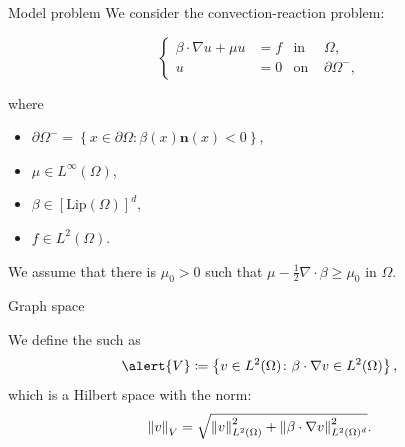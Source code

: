 \begin{frame}{Model problem}
	We consider the convection-reaction problem:
	\begin{block}{}
	\begin{equation*}
	\left\{
	\begin{aligned}
	\beta\cdot\nabla u+\mu u&=f & \text{in } &\Omega, \\
	u&=0 & \text{on } &\partial\Omega^-,
	\end{aligned}
	\right.
	\end{equation*}
	\end{block}
	where 
	\begin{itemize}
		\item $\partial\Omega^-=\left\{x\in\partial\Omega\colon \beta(x)\mathbf{n}(x)<0\right\},$
		\item $\mu\in L^\infty(\Omega)$,
		\item $\beta\in\left[\text{Lip}(\Omega)\right]^d$,
		\item $f\in L^2(\Omega)$.
	\end{itemize}
	\vspace*{.5cm}
	We assume that there is $\mu_0>0$ such that $\displaystyle\mu-\frac{1}{2}\nabla\cdot\beta\geq\mu_0$ in $\Omega$.
	
	\end{frame}
	
	\begin{frame}{Graph space}
	
	\begin{definicion}
	We define the  such as $$\alert{V}\coloneqq\left\{v\in L^2(\Omega)\colon\beta\cdot\nabla v\in L^2(\Omega) \right\},$$
	which is a Hilbert space with the norm:
	$$
	\left\|v\right\|_V=\sqrt{\left\|v\right\|_{L^2(\Omega)}^2+\left\|\beta\cdot\nabla v\right\|_{L^2(\Omega)^d}^2}.
	$$
	\end{definicion}
	\end{frame}
	

